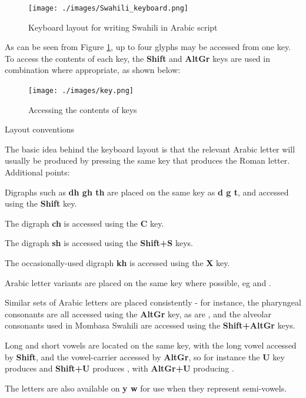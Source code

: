 \documentclass[a4paper,10pt, oneside]{book}
\newcommand\AS[1]{{\citationfont\RLE{#1}}}
\begin{document}
\begin{figure}[h]
 \centering
 \texttt{[image: ./images/Swahili\_keyboard.png]}
 \caption{Keyboard layout for writing Swahili in Arabic script}
 \label{fig:kblayout}
\end{figure}

As can be seen from Figure \ref{fig:kblayout}, up to four glyphs may be accessed from one key.  To access the contents of each key, the \textbf{Shift} and \textbf{AltGr} keys are used in combination where appropriate, as shown below:

\begin{figure}[h]
 \centering
 \texttt{[image: ./images/key.png]}
 \caption{Accessing the contents of keys}
 \label{fig:key}
\end{figure}


Layout conventions

The basic idea behind the keyboard layout is that the relevant Arabic letter will usually be produced by pressing the same key that produces the Roman letter. Additional points:

Digraphs such as \textbf{dh gh th} are placed on the same key as \textbf{d g t}, and accessed using the \textbf{Shift} key.

The digraph \textbf{ch} is accessed using the \textbf{C} key.

The digraph \textbf{sh} is accessed using the \textbf{Shift+S} keys.

The occasionally-used digraph \textbf{kh} is accessed using the \textbf{X} key.

Arabic letter variants are placed on the same key where possible, eg \AS{ي} and \AS{ى}.

Similar sets of Arabic letters are placed consistently - for instance, the pharyngeal consonants \AS{ص ض ط ظ} are all accessed using the \textbf{AltGr} key, as are \AS{ؤ ئ}, and the alveolar consonants \AS{ٹ ڈ} used in Mombasa Swahili are accessed using the \textbf{Shift+AltGr} keys.

Long and short vowels are located on the same key, with the long vowel accessed by \textbf{Shift}, and the vowel-carrier accessed by \textbf{AltGr}, so for instance the \textbf{U} key produces \AS{ُ } and \textbf{Shift+U} produces \AS{و}, with \textbf{AltGr+U} producing \AS{ؤ}.

The letters \AS{و ي} are also available on \textbf{y w} for use when they represent semi-vowels.
\end{document}
